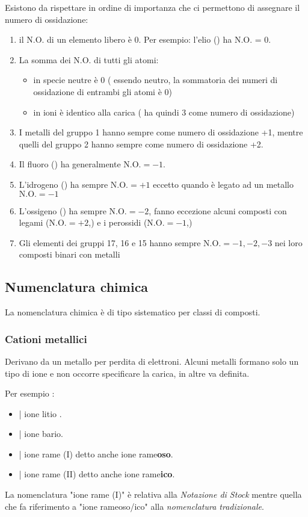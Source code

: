 Esistono  da rispettare in ordine di importanza che ci permettono di assegnare il numero di ossidazione: 
\begin{enumerate}
    \item il N.O. di un elemento libero è 0. Per esempio: l'elio () ha N.O. = 0. 
    \item La somma dei N.O. di tutti gli atomi:
            \begin{itemize}
            \item in specie neutre è 0 ( essendo neutro, la sommatoria dei numeri di ossidazione di entrambi gli atomi è 0)
            \item in ioni è identico alla carica ( ha quindi 3 come numero di ossidazione)
        \end{itemize}
    \item I metalli del gruppo 1 hanno sempre come numero di ossidazione +1, mentre quelli del gruppo 2 hanno sempre come numero di ossidazione +2.
    \item Il fluoro () ha generalmente $\text{N.O.}=-1$.
    \item L'idrogeno () ha sempre $\text{N.O.}=+1$ eccetto quando è legato ad un metallo $\text{N.O.}=-1$
    \item L'ossigeno () ha sempre $\text{N.O.}=-2$, fanno eccezione alcuni composti con legami  ($\text{N.O.}=+2$,) e i perossidi ($\text{N.O.}=-1$,)
    \item Gli elementi dei gruppi 17, 16 e 15 hanno sempre $\text{N.O.}=-1,-2,-3$ nei loro composti binari con metalli
    
\end{enumerate}
\subsection{Numenclatura chimica}
La nomenclatura chimica è di tipo sistematico per classi di composti.

\subsubsection{Cationi metallici}
Derivano da un  metallo per perdita di elettroni. 
Alcuni metalli formano solo un tipo di ione e non occorre specificare la carica, in altre va definita. 

Per esempio : 
\begin{itemize}
    \item {} | ione litio .
    \item {} | ione bario.
    \item {} | ione rame (I) detto anche ione rame\textbf{oso}.
    \item {} | ione rame (II) detto anche ione rame\textbf{ico}.
\end{itemize}
La nomenclatura "ione rame (I)" è relativa alla \emph{Notazione di Stock} mentre quella che fa riferimento a "ione rameoso/ico" alla \emph{nomenclatura tradizionale}.

